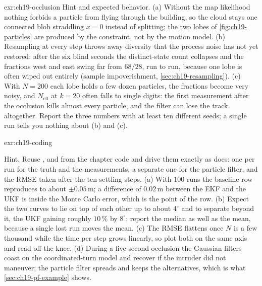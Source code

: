 \begin{solution}{exr:ch19-occlusion}
Hint and expected behavior. (a) Without the map likelihood nothing forbids a particle from flying through the building, so the cloud stays one connected blob straddling $x = 0$ instead of splitting; the two lobes of \cref{fig:ch19-particles} are produced by the constraint, not by the motion model. (b) Resampling at every step throws away diversity that the process noise has not yet restored: after the six blind seconds the distinct-state count collapses and the fractions west and east swing far from $68/28$, run to run, because one lobe is often wiped out entirely (sample impoverishment, \cref{sec:ch19-resampling}). (c) With $N = 200$ each lobe holds a few dozen particles, the fractions become very noisy, and $N_{\mathrm{eff}}$ at $k = 20$ often falls to single digits: the first measurement after the occlusion kills almost every particle, and the filter can lose the track altogether. Report the three numbers with at least ten different seeds; a single run tells you nothing about (b) and (c).
\end{solution}

\begin{solution}{exr:ch19-coding}
\begin{sloppypar}
Hint. Reuse ,  and  from the chapter code and drive them exactly as  does: one  per run for the truth and the measurements, a separate one for the particle filter, and the RMSE taken after the ten settling steps. (a) With $100$ runs the baseline row reproduces to about $\pm 0.05\,\mathrm{m}$; a difference of $0.02\,\mathrm{m}$ between the EKF and the UKF is inside the Monte Carlo error, which is the point of the row. (b) Expect the two curves to lie on top of each other up to about $4^\circ$ and to separate beyond it, the UKF gaining roughly $10\,\%$ by $8^\circ$; report the median as well as the mean, because a single lost run moves the mean. (c) The RMSE flattens once $N$ is a few thousand while the time per step grows linearly, so plot both on the same axis and read off the knee. (d) During a five-second occlusion the Gaussian filters coast on the coordinated-turn model and recover if the intruder did not maneuver; the particle filter spreads and keeps the alternatives, which is what \cref{sec:ch19-pf-example} shows.
\end{sloppypar}
\end{solution}


